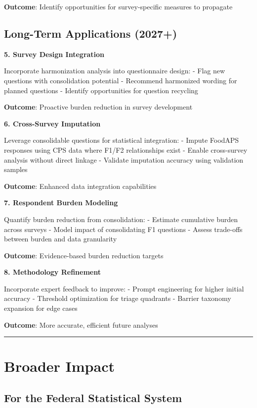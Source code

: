\documentclass[
  letterpaper,
]{report}
\begin{document}
\textbf{Outcome}: Identify opportunities for survey-specific measures to
propagate

\subsection{Long-Term Applications
(2027+)}\label{long-term-applications-2027}

\textbf{5. Survey Design Integration}

Incorporate harmonization analysis into questionnaire design: - Flag new
questions with consolidation potential - Recommend harmonized wording
for planned questions - Identify opportunities for question recycling

\textbf{Outcome}: Proactive burden reduction in survey development

\textbf{6. Cross-Survey Imputation}

Leverage consolidable questions for statistical integration: - Impute
FoodAPS responses using CPS data where F1/F2 relationships exist -
Enable cross-survey analysis without direct linkage - Validate
imputation accuracy using validation samples

\textbf{Outcome}: Enhanced data integration capabilities

\textbf{7. Respondent Burden Modeling}

Quantify burden reduction from consolidation: - Estimate cumulative
burden across surveys - Model impact of consolidating F1 questions -
Assess trade-offs between burden and data granularity

\textbf{Outcome}: Evidence-based burden reduction targets

\textbf{8. Methodology Refinement}

Incorporate expert feedback to improve: - Prompt engineering for higher
initial accuracy - Threshold optimization for triage quadrants - Barrier
taxonomy expansion for edge cases

\textbf{Outcome}: More accurate, efficient future analyses

\begin{center}\rule{0.5\linewidth}{0.5pt}\end{center}

\section{Broader Impact}\label{broader-impact}

\subsection{For the Federal Statistical
System}\label{for-the-federal-statistical-system}
\end{document}
